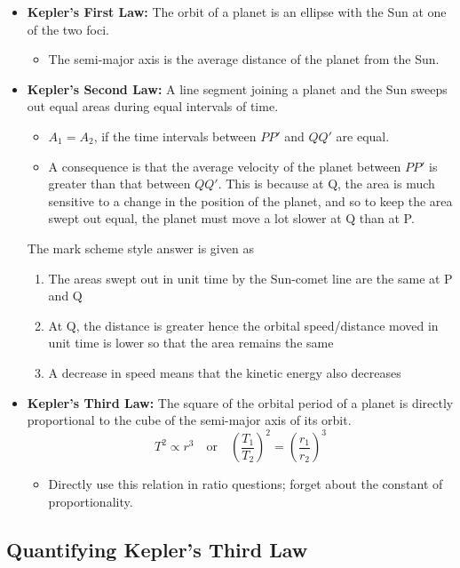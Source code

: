\documentclass[a4paper,12pt]{article}
\begin{document}
\begin{itemize}
  \item \textbf{Kepler's First Law:} The orbit of a planet is an ellipse with the Sun at one of the two foci.
        \begin{itemize}
          \item The semi-major axis is the average distance of the planet from the Sun.
        \end{itemize}
  \item \textbf{Kepler's Second Law:} A line segment joining a planet and the Sun sweeps out equal areas during equal intervals of time.
        \begin{itemize}
          \item $A_1 = A_2$, if the time intervals between $PP'$ and $QQ'$ are equal.
          \item A consequence is that the average velocity of the planet between $PP'$ is greater than that between $QQ'$. This is because at Q, the area is much sensitive to a change in the position of the planet, and so to keep the area swept out equal, the planet must move a lot slower at Q than at P.
        \end{itemize}
        The mark scheme style answer is given as
        \begin{enumerate}
          \item The areas swept out in unit time by the Sun-comet line are the same at P and Q
          \item At Q, the distance is greater hence the orbital speed/distance moved in unit
                time is lower so that the area remains the same
          \item  A decrease in speed means that the kinetic energy also decreases
        \end{enumerate}
  \item \textbf{Kepler's Third Law:} The square of the orbital period of a planet is directly proportional to the cube of the semi-major axis of its orbit. $$T^2 \propto r^3 \quad\text{or}\quad \left(\frac{T_1}{T_2}\right)^2 = \left(\frac{r_1}{r_2}\right)^3$$
        \begin{itemize}
          \item Directly use this relation in ratio questions; forget about the constant of proportionality.
        \end{itemize}
\end{itemize}

\subsection{Quantifying Kepler's Third Law}
\end{document}
